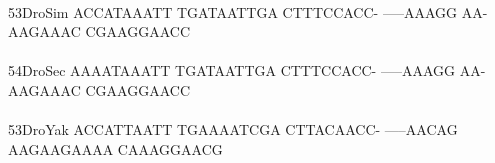 \documentclass[11pt,twoside,reqno,a4paper]{article}
\begin{document}
{\hspace*{4\charwidth}\hspace*{7\charwidth}\hspace*{1\charwidth}\hspace*{1\charwidth}\hspace*{1\charwidth}\hspace*{1\charwidth}\hspace*{1\charwidth}\hspace*{1\charwidth}\\
53\hspace*{2\charwidth}DroSim	ACCATAAATT	TGATAATTGA	CTTTCCACC-	-----AAAGG	AA-AAGAAAC	CGAAGGAACC	\\
\hspace*{4\charwidth}\hspace*{7\charwidth}\hspace*{1\charwidth}\hspace*{1\charwidth}\hspace*{1\charwidth}\hspace*{1\charwidth}\hspace*{1\charwidth}\hspace*{1\charwidth}\\
54\hspace*{2\charwidth}DroSec	AAAATAAATT	TGATAATTGA	CTTTCCACC-	-----AAAGG	AA-AAGAAAC	CGAAGGAACC	\\
\hspace*{4\charwidth}\hspace*{7\charwidth}\hspace*{1\charwidth}\hspace*{1\charwidth}\hspace*{1\charwidth}\hspace*{1\charwidth}\hspace*{1\charwidth}\hspace*{1\charwidth}\\
53\hspace*{2\charwidth}DroYak	ACCATTAATT	TGAAAATCGA	CTTACAACC-	-----AACAG	AAGAAGAAAA	CAAAGGAACG	\\
\hspace*{4\charwidth}\hspace*{7\charwidth}\hspace*{1\charwidth}\hspace*{1\charwidth}\hspace*{1\charwidth}\hspace*{1\charwidth}\hspace*{1\charwidth}\hspace*{1\charwidth}\\
}
\end{document}
